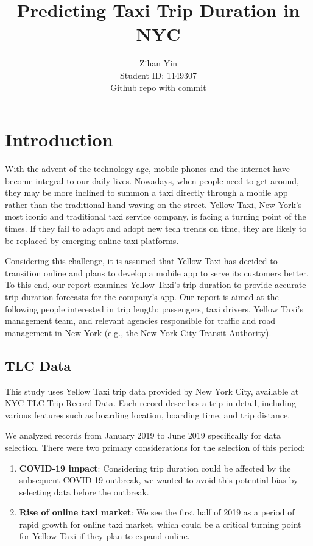 \documentclass[11pt]{article}
\title{\textbf{Predicting Taxi Trip Duration in NYC}}
\author{
Zihan Yin \\
Student ID: 1149307 \\
\href{https://github.com/MAST30034-Applied-Data-Science/mast30034-project-1-ZihanYin12138}{Github repo with commit}
}
\begin{document}
\maketitle

\section{Introduction}
With the advent of the technology age, mobile phones and the internet have become integral to our daily lives. Nowadays, when people need to get around, they may be more inclined to summon a taxi directly through a mobile app rather than the traditional hand waving on the street. Yellow Taxi, New York's most iconic and traditional taxi service company, is facing a turning point of the times. If they fail to adapt and adopt new tech trends on time, they are likely to be replaced by emerging online taxi platforms.

Considering this challenge, it is assumed that Yellow Taxi has decided to transition online and plans to develop a mobile app to serve its customers better. To this end, our report examines Yellow Taxi's trip duration to provide accurate trip duration forecasts for the company's app. Our report is aimed at the following people interested in trip length: passengers, taxi drivers, Yellow Taxi's management team, and relevant agencies responsible for traffic and road management in New York (e.g., the New York City Transit Authority).

\subsection{TLC Data}
This study uses Yellow Taxi trip data provided by New York City, available at NYC TLC Trip Record Data\cite{TLC_data}. Each record describes a trip in detail, including various features such as boarding location, boarding time, and trip distance.

We analyzed records from January 2019 to June 2019 specifically for data selection. There were two primary considerations for the selection of this period:

\begin{enumerate}
    \item \textbf{COVID-19 impact}: Considering trip duration could be affected by the subsequent COVID-19 outbreak, we wanted to avoid this potential bias by selecting data before the outbreak.
    \item \textbf{Rise of online taxi market}: We see the first half of 2019 as a period of rapid growth for online taxi market, which could be a critical turning point for Yellow Taxi if they plan to expand online.
\end{enumerate}
\end{document}
